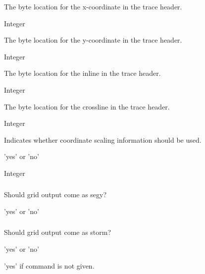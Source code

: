  \slist
   \item \Description The byte location for the x-coordinate in the trace header.
   \item \Argument Integer
   \item \Default
 \elist

 \slist
   \item \Description The byte location for the y-coordinate in the trace header.
   \item \Argument Integer
   \item \Default
 \elist

 \slist
   \item \Description The byte location for the inline in the trace header.
   \item \Argument Integer
   \item \Default
 \elist

 \slist
   \item \Description The byte location for the crossline in the trace header.
   \item \Argument Integer
   \item \Default
 \elist

 \slist
   \item \Description Indicates whether coordinate scaling information should be used.
   \item \Argument 'yes' or 'no'
   \item \Default
 \elist

 \slist
   \item \Description
   \item \Argument Integer
   \item \Default
 \elist

\subparagraph{}
 \slist
   \item \Description Should grid output come as segy?
   \item \Argument 'yes' or 'no'
   \item \Default
 \elist

\subparagraph{}
 \slist
   \item \Description Should grid output come as storm?
   \item \Argument 'yes' or 'no'
   \item \Default 'yes' if  command is not given.
 \elist


